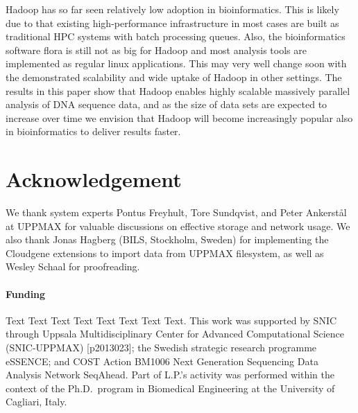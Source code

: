 \documentclass{bioinfo}
\begin{document}
Hadoop has so far seen relatively low adoption in bioinformatics. This is likely due to that existing high-performance infrastructure in most cases are built as traditional HPC systems with batch processing queues. Also, the bioinformatics software flora is still not as big for Hadoop and most analysis tools are implemented as regular linux applications. This may very well change soon with the demonstrated scalability and wide uptake of Hadoop in other settings. The results in this paper show that Hadoop enables highly scalable massively parallel analysis of DNA sequence data, and as the size of data sets are expected to increase over time we envision that Hadoop will become increasingly popular also in bioinformatics to deliver results faster.






%
%






\section*{Acknowledgement}
We thank system experts Pontus Freyhult, Tore Sundqvist, and Peter Ankerst{\aa}l at UPPMAX for valuable discussions on effective storage and network usage. We also thank Jonas Hagberg (BILS, Stockholm, Sweden) for implementing the Cloudgene extensions to import data from UPPMAX filesystem, as well as Wesley Schaal for proofreading.


\paragraph{Funding\textcolon} Text Text Text Text Text Text  Text Text.
This work was supported by SNIC through Uppsala Multidisciplinary Center for Advanced Computational Science (SNIC-UPPMAX) [p2013023]; the Swedish strategic research programme eSSENCE; and COST Action BM1006 Next Generation Sequencing Data Analysis Network SeqAhead. Part of L.P.'s activity was performed within the context of the Ph.D.\ program in Biomedical Engineering at the University of Cagliari, Italy.\\




%
%
%
%
%
%
%
%


\end{document}
